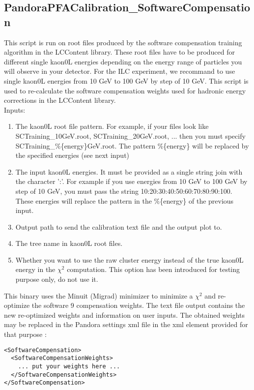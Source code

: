 \documentclass[11pt, oneside]{article}   	%
\begin{document}
\subsection{PandoraPFACalibration\_SoftwareCompensation}

This script is run on root files produced by the software compensation training algorithm in the LCContent library. These root files have to be produced for different single kaon0L energies depending on the energy range of particles you will observe in your detector. For the ILC experiment, we recommand to use single kaon0L energies from 10 GeV to 100 GeV by step of 10 GeV. This script is used to re-calculate the software compensation weights used for hadronic energy corrections in the LCContent library. \\

Inputs:
\begin{enumerate}
  \item The kaon0L root file pattern. For example, if your files look like SCTraining\_10GeV.root, SCTraining\_20GeV.root, ... then you must specify SCTraining\_\%\{energy\}GeV.root. The pattern \%\{energy\} will be replaced by the specified energies (see next input)
  \item The input kaon0L energies. It must be provided as a single string join with the character ':'. For example if you use energies from 10 GeV to 100 GeV by step of 10 GeV, you must pass the string 10:20:30:40:50:60:70:80:90:100. These energies will replace the pattern in the \%\{energy\} of the previous input.
  \item Output path to send the calibration text file and the output plot to.
  \item The tree name in kaon0L root files.
  \item Whether you want to use the raw cluster energy instead of the true kaon0L energy in the $\chi^2$ computation. This option has been introduced for testing purpose only, do not use it.
\end{enumerate}

This binary uses the Minuit (Migrad) minimizer to minimize a $\chi^2$ and re-optimize the software 9 compensation weights. The text file output contains the new re-optimized weights and information on user inputs. The obtained weights may be replaced in the Pandora settings xml file in the xml element provided for that purpose :

\begin{verbatim}
<SoftwareCompensation>
  <SoftwareCompensationWeights>
    ... put your weights here ...
  </SoftwareCompensationWeights>
</SoftwareCompensation>
\end{verbatim}
\end{document}

